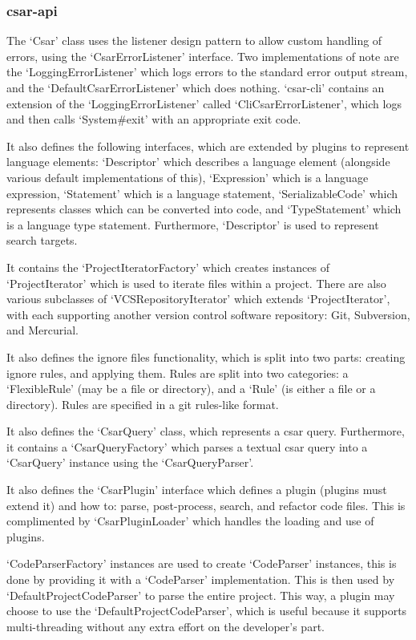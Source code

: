\documentclass[12pt, letterpaper]{article}
\begin{document}
\subsubsection{csar-api}
The `Csar' class uses the listener design pattern to allow custom handling of errors, using the `CsarErrorListener' interface.
Two implementations of note are the `LoggingErrorListener' which logs errors to the standard error output stream, and the `DefaultCsarErrorListener' which does nothing.
`csar-cli' contains an extension of the `LoggingErrorListener' called `CliCsarErrorListener', which logs and then calls `System\#exit' with an appropriate exit code.

It also defines the following interfaces, which are extended by plugins to represent language elements: `Descriptor' which describes a language element (alongside various default implementations of this), `Expression' which is a language expression, `Statement' which is a language statement, `SerializableCode' which represents classes which can be converted into code, and `TypeStatement' which is a language type statement.
Furthermore, `Descriptor' is used to represent search targets.

It contains the `ProjectIteratorFactory' which creates instances of `ProjectIterator' which is used to iterate files within a project.
There are also various subclasses of `VCSRepositoryIterator' which extends `ProjectIterator', with each supporting another version control software repository: Git, Subversion, and Mercurial.

It also defines the ignore files functionality, which is split into two parts: creating ignore rules, and applying them.
Rules are split into two categories: a `FlexibleRule' (may be a file or directory), and a `Rule' (is either a file or a directory).
Rules are specified in a git rules-like format.

It also defines the `CsarQuery' class, which represents a csar query.
Furthermore, it contains a `CsarQueryFactory' which parses a textual csar query into a `CsarQuery' instance using the `CsarQueryParser'.

It also defines the `CsarPlugin' interface which defines a plugin (plugins must extend it) and how to: parse, post-process, search, and refactor code files.
This is complimented by `CsarPluginLoader' which handles the loading and use of plugins.

`CodeParserFactory' instances are used to create `CodeParser' instances, this is done by providing it with a `CodeParser' implementation.
This is then used by `DefaultProjectCodeParser' to parse the entire project.
This way, a plugin may choose to use the `DefaultProjectCodeParser', which is useful because it supports multi-threading without any extra effort on the developer's part.
\end{document}
